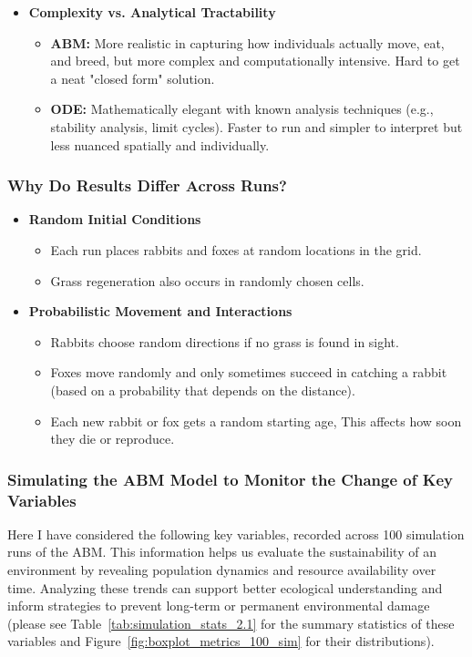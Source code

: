 \begin{itemize}
    \item \textbf{Complexity vs. Analytical Tractability}
    \begin{itemize}
        \item \textbf{ABM:} More realistic in capturing how individuals actually move, eat, and breed, but more complex and computationally intensive. Hard to get a neat "closed form" solution.
        \item \textbf{ODE:} Mathematically elegant with known analysis techniques (e.g., stability analysis, limit cycles). Faster to run and simpler to interpret but less nuanced spatially and individually.
    \end{itemize}
\end{itemize}

\subsubsection[short]{Why Do Results Differ Across Runs?}

\begin{itemize}
    \item \textbf{Random Initial Conditions}
    \begin{itemize}
        \item Each run places rabbits and foxes at random locations in the grid.
        \item Grass regeneration also occurs in randomly chosen cells.
    \end{itemize}

    \item \textbf{Probabilistic Movement and Interactions}
    \begin{itemize}
        \item Rabbits choose random directions if no grass is found in sight.
        \item Foxes move randomly and only sometimes succeed in catching a rabbit (based on a probability that depends on the distance).
        \item Each new rabbit or fox gets a random starting age, This affects how soon they die or reproduce.
    \end{itemize}

\end{itemize}

\subsubsection[short]{Simulating the ABM Model to Monitor the Change of Key Variables}
Here I have considered the following key variables, recorded across 100 simulation runs of the ABM. This information helps us evaluate the sustainability of an environment by revealing population dynamics and resource availability over time. Analyzing these trends can support better ecological understanding and inform strategies to prevent long-term or permanent environmental damage (please see Table~\ref{tab:simulation_stats_2.1} for the summary statistics of these variables and Figure~\ref{fig:boxplot_metrics_100_sim} for their distributions).

